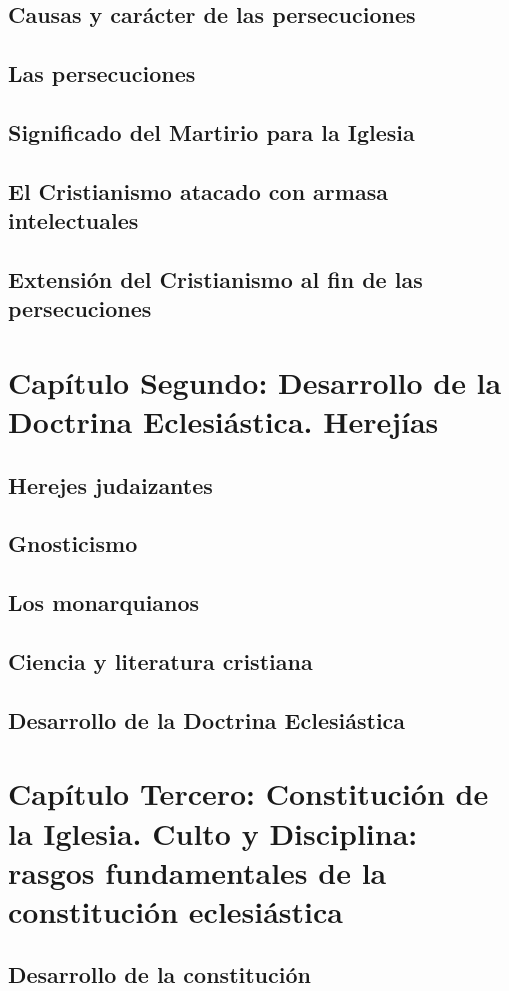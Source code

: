 \raggedbottom{} \documentclass[12pt]{book}
\begin{document}
\section{Causas y carácter de las persecuciones}
\section{Las persecuciones}
\section{Significado del Martirio para la Iglesia}
\section{El Cristianismo atacado con armasa intelectuales}
\section{Extensión del Cristianismo al fin de las persecuciones}
\chapter{Capítulo Segundo: Desarrollo de la Doctrina Eclesiástica. Herejías}
\section{Herejes judaizantes}
\section{Gnosticismo}
\section{Los monarquianos}
\section{Ciencia y literatura cristiana}
\section{Desarrollo de la Doctrina Eclesiástica}
\chapter{Capítulo Tercero: Constitución de la Iglesia. Culto y Disciplina: rasgos fundamentales de la constitución eclesiástica}
\section{Desarrollo de la constitución}
\end{document}
